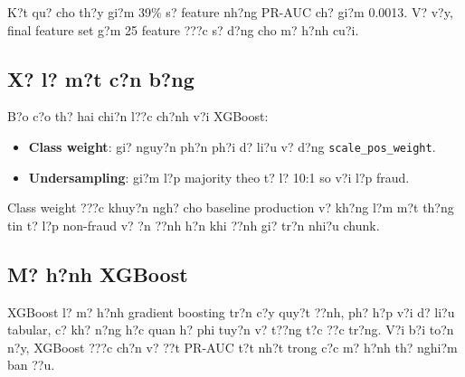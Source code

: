 K?t qu? cho th?y gi?m 39\% s? feature nh?ng PR-AUC ch? gi?m 0.0013. V? v?y, final feature set g?m 25 feature ???c s? d?ng cho m? h?nh cu?i.

\subsection{X? l? m?t c?n b?ng}

B?o c?o th? hai chi?n l??c ch?nh v?i XGBoost:
\begin{itemize}
    \item \textbf{Class weight}: gi? nguy?n ph?n ph?i d? li?u v? d?ng \texttt{scale\_pos\_weight}.
    \item \textbf{Undersampling}: gi?m l?p majority theo t? l? 10:1 so v?i l?p fraud.
\end{itemize}

Class weight ???c khuy?n ngh? cho baseline production v? kh?ng l?m m?t th?ng tin t? l?p non-fraud v? ?n ??nh h?n khi ??nh gi? tr?n nhi?u chunk.

\subsection{M? h?nh XGBoost}

XGBoost l? m? h?nh gradient boosting tr?n c?y quy?t ??nh, ph? h?p v?i d? li?u tabular, c? kh? n?ng h?c quan h? phi tuy?n v? t??ng t?c ??c tr?ng. V?i b?i to?n n?y, XGBoost ???c ch?n v? ??t PR-AUC t?t nh?t trong c?c m? h?nh th? nghi?m ban ??u.
